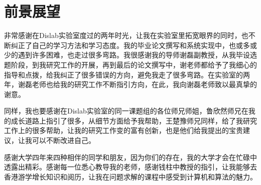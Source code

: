 \documentclass[winfonts]{njuthesis}
\begin{document}
	\section{前景展望}

	\begin{acknowledgement}
		
		非常感谢在Dislab实验室度过的两年时光，让我在实验室里拓宽眼界的同时，也不断纠正了自己的学习方法和学习态度。我的毕业论文撰写和系统实现中，也或多或少的遇到许多困难，也走过很多弯路。我很感谢我的导师谢磊副教授，从我毕设选题阶段，到我研究工作的开展，再到最后的论文撰写中，谢老师都给予了我细心的指导和点拨，给我纠正了很多错误的方向，避免我走了很多弯路。在实验室的两年，谢磊老师也给我的研究工作不断指引方向，在此，我向谢磊老师致以最真挚的谢意。
		
		同样，我也要感谢在Dislab实验室的同一课题组的各位师兄师姐，鲁欣然师兄在我的成长道路上指引了很多，从细节方面给予我帮助，王楚豫师兄同样，给了我研究工作上的很多帮助，让我的研究工作变的富有创新，也是他们给我提出的宝贵建议，让我可以不断改进自己。
		
		感谢大学四年来四种相伴的同学和朋友，因为你们的存在，我的大学才会在忙碌中透露出精彩。感谢每一位悉心教导我的老师，感谢钱柱中教授的指引，让我能够去香港游学增长知识和阅历，让我在问题求解的课程中感受到计算机和算法的魅力。
		
	\end{acknowledgement}
\end{document}
